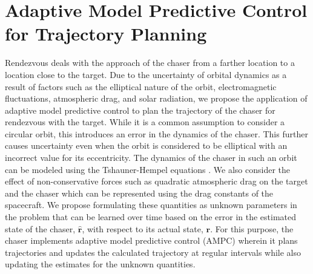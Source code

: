 \chapter{Adaptive Model Predictive Control for Trajectory Planning} \label{sec:chaser_ampc}
Rendezvous deals with the approach of the chaser from a farther location to a location close to the target.
Due to the uncertainty of orbital dynamics as a result of factors such as the elliptical nature of the orbit, electromagnetic fluctuations, atmospheric drag, and solar radiation, we propose the application of adaptive model predictive control to plan the trajectory of the chaser for rendezvous with the target.
While it is a common assumption to consider a circular orbit, this introduces an error in the dynamics of the chaser.
This further causes uncertainty even when the orbit is considered to be elliptical with an incorrect value for its eccentricity.
The dynamics of the chaser in such an orbit can be modeled using the Tshauner-Hempel equations \cite{yamanaka2002new,sinclair2015geometric}.
We also consider the effect of non-conservative forces such as quadratic atmospheric drag \cite{carter2002clohessy} on the target and the chaser which can be represented using the drag constants of the spacecraft.
We propose formulating these quantities as unknown parameters in the problem that can be learned over time based on the error in the estimated state of the chaser, $\hat{\boldsymbol{r}}$, with respect to its actual state, $\boldsymbol{r}$.
For this purpose, the chaser implements adaptive model predictive control (AMPC) wherein it plans trajectories and updates the calculated trajectory at regular intervals while also updating the estimates for the unknown quantities.

